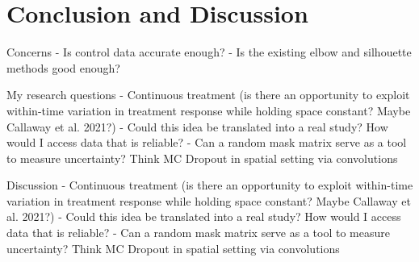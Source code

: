 \section{Conclusion and Discussion}

\begin{frame}{Concerns}
- Is control data accurate enough?
- Is the existing elbow and silhouette methods good enough?
\end{frame}

\begin{frame}{My research questions}
- Continuous treatment (is there an opportunity to exploit within-time variation in treatment response while holding space constant? Maybe Callaway et al. 2021?)
- Could this idea be translated into a real study? How would I access data that is reliable?
- Can a random mask matrix serve as a tool to measure uncertainty? Think MC Dropout in spatial setting via convolutions
\end{frame}

\begin{frame}{Discussion}
- Continuous treatment (is there an opportunity to exploit within-time variation in treatment response while holding space constant? Maybe Callaway et al. 2021?)
- Could this idea be translated into a real study? How would I access data that is reliable?
- Can a random mask matrix serve as a tool to measure uncertainty? Think MC Dropout in spatial setting via convolutions
\end{frame}